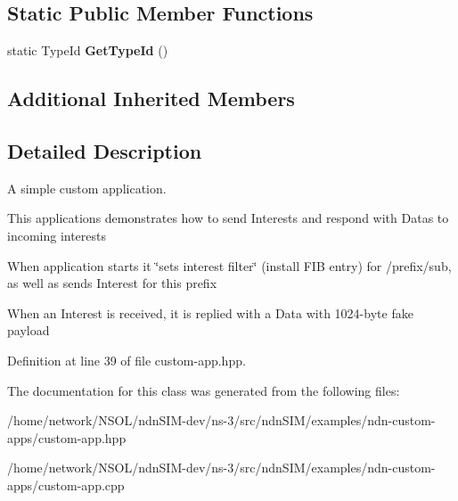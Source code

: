 \subsection*{Static Public Member Functions}
\begin{DoxyCompactItemize}
\item 
static Type\+Id {\bfseries Get\+Type\+Id} ()\hypertarget{classns3_1_1CustomApp_a36989a8cd5522013a67f5a32b425d37c}{}\label{classns3_1_1CustomApp_a36989a8cd5522013a67f5a32b425d37c}

\end{DoxyCompactItemize}
\subsection*{Additional Inherited Members}


\subsection{Detailed Description}
A simple custom application. 

This applications demonstrates how to send Interests and respond with Datas to incoming interests

When application starts it \char`\"{}sets interest filter\char`\"{} (install F\+IB entry) for /prefix/sub, as well as sends Interest for this prefix

When an Interest is received, it is replied with a Data with 1024-\/byte fake payload 

Definition at line 39 of file custom-\/app.\+hpp.



The documentation for this class was generated from the following files\+:\begin{DoxyCompactItemize}
\item 
/home/network/\+N\+S\+O\+L/ndn\+S\+I\+M-\/dev/ns-\/3/src/ndn\+S\+I\+M/examples/ndn-\/custom-\/apps/custom-\/app.\+hpp\item 
/home/network/\+N\+S\+O\+L/ndn\+S\+I\+M-\/dev/ns-\/3/src/ndn\+S\+I\+M/examples/ndn-\/custom-\/apps/custom-\/app.\+cpp\end{DoxyCompactItemize}
